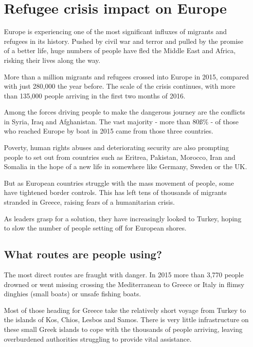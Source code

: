 \section{Refugee crisis impact on Europe}

Europe is experiencing one of the most significant influxes of migrants and refugees in its history. Pushed by civil war and terror and pulled by the promise of a better life, huge numbers of people have fled the Middle East and Africa, risking their lives along the way.

More than a million migrants and refugees crossed into Europe in 2015, compared with just 280,000 the year before. The scale of the crisis continues, with more than 135,000 people arriving in the first two months of 2016.

Among the forces driving people to make the dangerous journey are the conflicts in Syria, Iraq and Afghanistan. The vast majority - more than 80ß\% - of those who reached Europe by boat in 2015 came from those three countries.

Poverty, human rights abuses and deteriorating security are also prompting people to set out from countries such as Eritrea, Pakistan, Morocco, Iran and Somalia in the hope of a new life in somewhere like Germany, Sweden or the UK.

But as European countries struggle with the mass movement of people, some have tightened border controls. This has left tens of thousands of migrants stranded in Greece, raising fears of a humanitarian crisis.

As leaders grasp for a solution, they have increasingly looked to Turkey, hoping to slow the number of people setting off for European shores.

\subsection{What routes are people using?} 

The most direct routes are fraught with danger. In 2015 more than 3,770 people drowned or went missing crossing the Mediterranean to Greece or Italy in flimsy dinghies (small boats) or unsafe fishing boats.

Most of those heading for Greece take the relatively short voyage from Turkey to the islands of Kos, Chios, Lesbos and Samos. There is very little infrastructure on these small Greek islands to cope with the thousands of people arriving, leaving overburdened authorities struggling to provide vital assistance.

